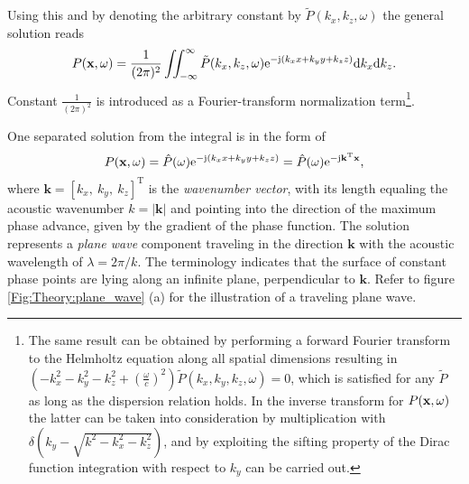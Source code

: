 Using this and by denoting the arbitrary constant by $\tilde{P}(k_x,k_z, \omega)$ the general solution reads
\begin{equation}
P(\mathbf{x},\omega) = \frac{1}{(2\pi)^2}\iint_{-\infty}^{\infty} \tilde{P}(k_x,k_z, \omega)  \mathrm{e}^{- \mathrm{j} \left( k_x x + k_y y + k_z z \right) }
\mathrm{d} k_x\mathrm{d} k_z.
\label{Eq:Theory:Helmholtz_Inverse_Fourier}
\end{equation}
Constant $\frac{1}{(2\pi)^2}$ is introduced as a Fourier-transform normalization term\footnote{The same result can be obtained by performing a forward Fourier transform to the Helmholtz equation along all spatial dimensions resulting in $\left(-k_x^2 -k_y^2 -k_z^2 + \left(\frac{\omega}{c}\right)^2 \right)\tilde{P}(k_x,k_y,k_z,\omega) = 0$, which is satisfied for any $\tilde{P}$ as long as the dispersion relation holds. In the inverse transform for $P(\mathbf{x},\omega)$ the latter can be taken into consideration by multiplication with $\delta(k_y - \sqrt{k^2-k_x^2-k_z^2})$, and by exploiting the sifting property of the Dirac function integration with respect to $k_y$ can be carried out.}.

\vspace{3mm}
One separated solution from the integral is in the form of \cite{Williams1999}
\begin{equation}
P(\mathbf{x},\omega) = \hat{P}(\omega) \mathrm{e}^{-\mathrm{j} \left( k_x x + k_y y + k_z z \right) } =  \hat{P}(\omega) \mathrm{e}^{-\mathrm{j} \mathbf{k}^{\mathrm{T}} \mathbf{x} },
\end{equation}
where $\mathbf{k} = [k_x,\ k_y,\ k_z]^{\mathrm{T}}$ is the \emph{wavenumber vector}, with its length equaling the acoustic wavenumber $k = | \mathbf{k}|$ and pointing into the direction of the maximum phase advance, given by the gradient of the phase function.
The solution represents a \emph{plane wave} component traveling in the direction $\mathbf{k}$ with the acoustic wavelength of $\lambda = 2\pi/k$. The terminology indicates that the surface of constant phase points are lying along an infinite plane, perpendicular to $\mathbf{k}$. Refer to figure \ref{Fig:Theory:plane_wave} (a) for the illustration of a traveling plane wave.

